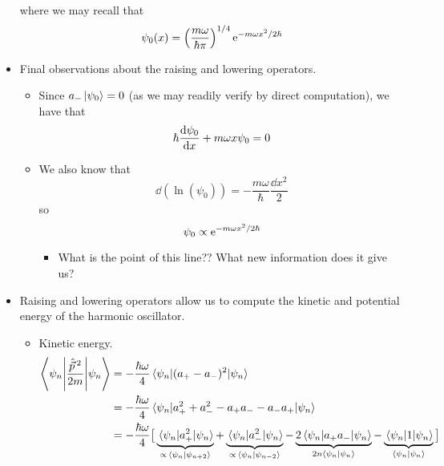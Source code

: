 \documentclass[../notes.tex]{subfiles}
\begin{document}
\begin{itemize}
\begin{equation*}
    \end{equation*}
    where we may recall that
    \begin{equation*}
        \psi_0(x) = \left( \frac{m\omega}{\hbar\pi} \right)^{1/4}\e[-m\omega x^2/2\hbar]
    \end{equation*}
    \item Final observations about the raising and lowering operators.
    \begin{itemize}
        \item Since $a_-\ket{\psi_0}=0$ (as we may readily verify by direct computation), we have that
        \begin{equation*}
            \hbar\dv{\psi_0}{x}+m\omega x\psi_0 = 0
        \end{equation*}
        \item We also know that
        \begin{equation*}
            \dd(\ln(\psi_0)) = -\frac{m\omega}{\hbar}\frac{\dd{x}^2}{2}
        \end{equation*}
        so
        \begin{equation*}
            \psi_0 \propto \e[-m\omega x^2/2\hbar]
        \end{equation*}
        \begin{itemize}
            \item What is the point of this line?? What new information does it give us?
        \end{itemize}
    \end{itemize}
    \item Raising and lowering operators allow us to compute the kinetic and potential energy of the harmonic oscillator.
    \begin{itemize}
        \item Kinetic energy.
        \begin{align*}
            \ev**{\frac{\hat{\vec{p}}{\,}^2}{2m}}{\psi_n} &= -\frac{\hbar\omega}{4}\ev{(a_+-a_-)^2}{\psi_n}\\
            &= -\frac{\hbar\omega}{4}\ev{a_+^2+a_-^2-a_+a_--a_-a_+}{\psi_n}\\
            &= -\frac{\hbar\omega}{4}\big[ \underbrace{\ev{a_+^2}{\psi_n}}_{\propto\,\braket{\psi_n}{\psi_{n+2}}}+\underbrace{\ev{a_-^2}{\psi_n}}_{\propto\,\braket{\psi_n}{\psi_{n-2}}}-\underbrace{2\ev{a_+a_-}{\psi_n}}_{2n\braket{\psi_n}}-\underbrace{\ev{1}{\psi_n}}_{\braket{\psi_n}} \big]\\

\end{align*}
\end{itemize}
\end{itemize}
\end{document}
